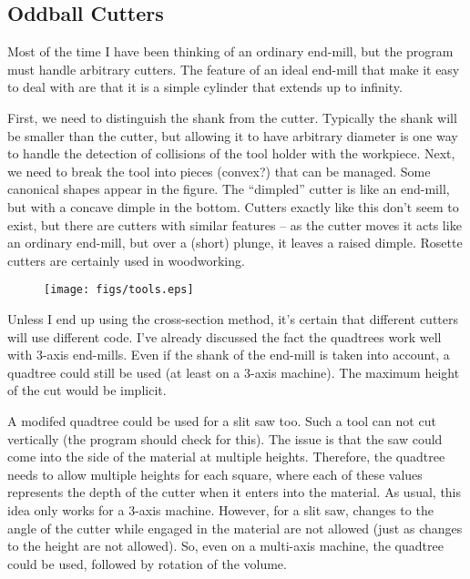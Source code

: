 \documentclass[titlepage,oneside,10pt]{article}
\begin{document}
\subsection{Oddball Cutters}

Most of the time I have been thinking of an ordinary end-mill, but the
program must handle arbitrary cutters. The feature of an ideal end-mill that
make it easy to deal with are that it is a simple cylinder that
extends up to infinity.

First, we need to distinguish the shank from the cutter. Typically the
shank will be smaller than the cutter, but allowing it to have
arbitrary diameter is one way to handle the detection of collisions of
the tool holder with the workpiece. Next, we need to break the tool
into pieces (convex?) that can be managed. Some canonical shapes
appear in the figure. The ``dimpled'' cutter is like an end-mill, but
with a concave dimple in the bottom. Cutters exactly like this don't
seem to exist, but there are cutters with similar features -- as the
cutter moves it acts like an ordinary end-mill, but over a (short)
plunge, it leaves a raised dimple. Rosette cutters are certainly used
in woodworking.

\begin{figure}
\begin{center}
  \texttt{[image: figs/tools.eps]}
\end{center}
\end{figure}

Unless I end up using the cross-section method, it's certain that
different cutters will use different code. I've already discussed the
fact the quadtrees work well with 3-axis end-mills. Even if the shank
of the end-mill is taken into account, a quadtree could still be used
(at least on a 3-axis machine). The maximum height of the cut would be
implicit. 

A modifed quadtree could be used for a slit saw too. Such a tool
can not cut vertically (the program should check for this). The issue is that
the saw could come into the side of the material at multiple
heights. Therefore, the quadtree needs to allow multiple heights for
each square, where each of these values represents the depth of the
cutter when it enters into the material. As usual, this idea only
works for a 3-axis machine. However, for a slit saw, changes to the
angle of the cutter while engaged in the material are not allowed
(just as changes to the height are not allowed). So, even on a
multi-axis machine, the quadtree could be used, followed by rotation
of the volume.
\end{document}
